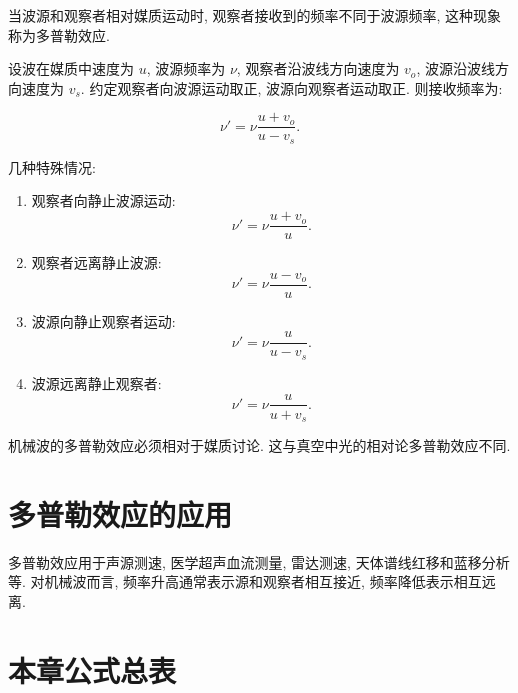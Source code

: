 \documentclass[
  a4paper,
]{ctexrep}
\providecommand{\tightlist}{%
  \setlength{\itemsep}{0pt}\setlength{\parskip}{0pt}}
\begin{document}
当波源和观察者相对媒质运动时, 观察者接收到的频率不同于波源频率,
这种现象称为多普勒效应.

设波在媒质中速度为 \(u\), 波源频率为 \(\nu\), 观察者沿波线方向速度为
\(v_o\), 波源沿波线方向速度为 \(v_s\). 约定观察者向波源运动取正,
波源向观察者运动取正. 则接收频率为:

\[
\nu'=\nu\frac{u+v_o}{u-v_s}.
\]

几种特殊情况:

\begin{enumerate}
\def\labelenumi{\arabic{enumi}.}
\tightlist
\item
  观察者向静止波源运动: \[
  \nu'=\nu\frac{u+v_o}{u}.
  \]
\item
  观察者远离静止波源: \[
  \nu'=\nu\frac{u-v_o}{u}.
  \]
\item
  波源向静止观察者运动: \[
  \nu'=\nu\frac{u}{u-v_s}.
  \]
\item
  波源远离静止观察者: \[
  \nu'=\nu\frac{u}{u+v_s}.
  \]
\end{enumerate}

机械波的多普勒效应必须相对于媒质讨论.
这与真空中光的相对论多普勒效应不同.

\section{多普勒效应的应用}\label{ux591aux666eux52d2ux6548ux5e94ux7684ux5e94ux7528}

多普勒效应用于声源测速, 医学超声血流测量, 雷达测速,
天体谱线红移和蓝移分析等. 对机械波而言,
频率升高通常表示源和观察者相互接近, 频率降低表示相互远离.

\section{本章公式总表}\label{ux672cux7ae0ux516cux5f0fux603bux8868-2}
\end{document}
